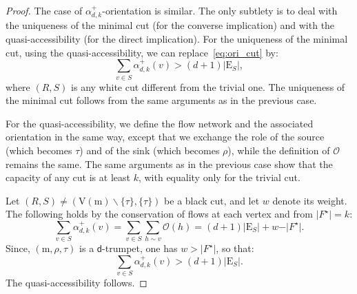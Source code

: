 \documentclass[10pt,a4paper]{amsart}
\newcommand{\cO}{\mathcal{O}}
\newcommand{\dtrum}{$\mathsf{d}$-trumpet}
\newcommand{\rV}{\mathrm{V}}
\renewcommand{\rm}{\mathrm{m}}
\begin{document}
\begin{proof}
The case of $\alpha_{d,k}^+$-orientation is similar. The only subtlety is to deal with the uniqueness of the minimal cut (for the converse implication) and with the quasi-accessibility (for  the direct implication). For the uniqueness of the minimal cut, using the quasi-accessibility, we can replace~\eqref{eq:ori_cut} by: 
\[
\sum_{v\in S}\alpha_{d,k}^+(v)  > \left(d+1\right) \vert\mathrm{E}_S\vert,
\]
where $(R,S)$ is any white cut different from the trivial one. The uniqueness of the minimal cut follows from the same arguments as in the previous case. 

For the quasi-accessibility, we define the flow network and the associated orientation in the same way, except that we exchange the role of the source (which becomes $\tau$) and of the sink (which becomes $\rho$), while the definition of $\cO$ remains the same. The same arguments as in the previous case show that the capacity of any cut is at least $k$, with equality only for the trivial cut.

Let $(R,S)\neq (\rV(\rm)\backslash\{\tau\},\{\tau\})$ be a black cut, and let $w$ denote its weight. The following holds by the conservation of flows at each vertex and from $\vert F^\star\vert = k$:
\begin{equation*}
	\sum_{v\in S}\alpha_{d,k}^+(v) = \sum_{v\in S}\sum_{h\sim v} \cO(h) = \left(d+1\right) \vert\mathrm{E}_S\vert + w - \vert F^\star\vert.
\end{equation*}
Since, $(\rm,\rho,\tau)$ is a \dtrum, one has $w>\vert F^\star\vert$, so that:
\begin{equation*}
	\sum_{v\in S}\alpha_{d,k}^+(v) > \left(d+1\right) \vert\mathrm{E}_S\vert.
\end{equation*}
The quasi-accessibility follows. 
\end{proof}
\end{document}
